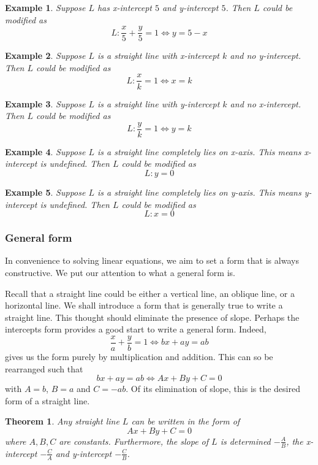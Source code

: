 \documentclass[12pt]{article}
\newtheorem*{theorem}{Theorem}
\newtheorem*{example}{Example}
\begin{document}
    \begin{example}
        Suppose $L$ has x-intercept $5$ and y-intercept $5$. Then $L$ could be modified as $$L:\frac{x}{5}+\frac{y}{5}=1\iff y=5-x$$
    \end{example}
    
    \begin{example}
        Suppose $L$ is a straight line with x-intercept $k$ and no y-intercept. Then $L$ could be modified as $$L:\frac{x}{k}=1\iff x=k$$
    \end{example}
    
    \begin{example}
        Suppose $L$ is a straight line with y-intercept $k$ and no x-intercept. Then $L$ could be modified as $$L:\frac{y}{k}=1\iff y=k$$
    \end{example}
    
    \begin{example}
        Suppose $L$ is a straight line completely lies on x-axis. This means x-intercept is undefined. Then $L$ could be modified as $$L:y=0$$
    \end{example}
    
    \begin{example}
        Suppose $L$ is a straight line completely lies on y-axis. This means y-intercept is undefined. Then $L$ could be modified as $$L:x=0$$
    \end{example}

    \subsubsection*{General form}

    In convenience to solving linear equations, we aim to set a form that is always constructive. We put our attention to what a general form is.

    Recall that a straight line could be either a vertical line, an oblique line, or a horizontal line. We shall introduce a form that is generally true to write a straight line. This thought should eliminate the presence of slope. Perhaps the intercepts form provides a good start to write a general form. Indeed, $$\frac{x}{a}+\frac{y}{b}=1 \iff bx+ay=ab$$ gives us the form purely by multiplication and addition. This can so be rearranged such that $$bx+ay=ab\iff Ax+By+C=0$$ with $A=b$, $B=a$ and $C=-ab$. Of its elimination of slope, this is the desired form of a straight line.

    \begin{theorem}
        Any straight line $L$ can be written in the form of $$Ax+By+C=0$$ where $A,B,C$ are constants. Furthermore, the slope of $L$ is determined $-\frac{A}{B}$, the x-intercept $-\frac{C}{A}$ and y-intercept $-\frac{C}{B}$.
    \end{theorem}
\end{document}
